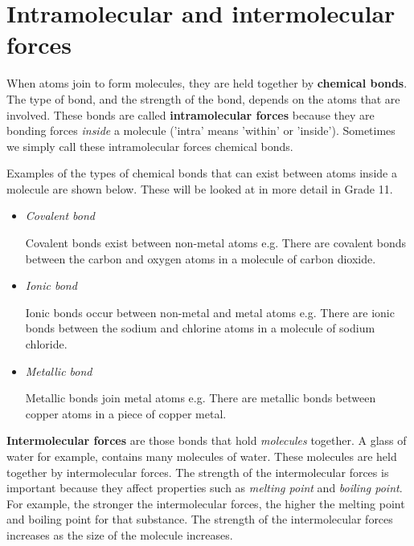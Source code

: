 \section{Intramolecular and intermolecular forces}
\label{sec:micro:intrainter}

When atoms join to form molecules, they are held together by \textbf{chemical bonds}. The type of bond, and the strength of the bond, depends on the atoms that are involved. These bonds are called \textbf{intramolecular forces} because they are bonding forces \textit{inside} a molecule ('intra' means 'within' or 'inside'). Sometimes we simply call these intramolecular forces chemical bonds.


Examples of the types of chemical bonds that can exist between atoms inside a molecule are shown below. These will be looked at in more detail in Grade 11. 

\begin{itemize}
   \item{\textit{Covalent bond} 

Covalent bonds exist between non-metal atoms e.g. There are covalent bonds between the carbon and oxygen atoms in a molecule of carbon dioxide.}

   \item{\textit{Ionic bond} 

Ionic bonds occur between non-metal and metal atoms e.g. There are ionic bonds between the sodium and chlorine atoms in a molecule of sodium chloride.}

   \item{\textit{Metallic bond} 

Metallic bonds join metal atoms e.g. There are metallic bonds between copper atoms in a piece of copper metal.}
\end{itemize}

\textbf{Intermolecular forces} are those bonds that hold \textit{molecules} together. A glass of water for example, contains many molecules of water. These molecules are held together by intermolecular forces. The strength of the intermolecular forces is important because they affect properties such as \textit{melting point} and \textit{boiling point}. For example, the stronger the intermolecular forces, the higher the melting point and boiling point for that substance. The strength of the intermolecular forces increases as the size of the molecule increases. 

